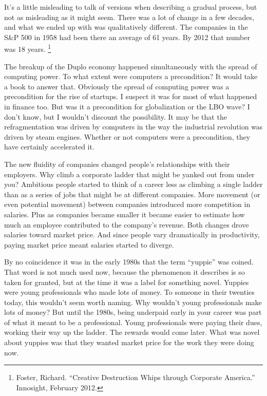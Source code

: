 It's a little misleading to talk of versions when describing a gradual
process, but not as misleading as it might seem. There was a lot of
change in a few decades, and what we ended up with was qualitatively
different. The companies in the S\&P 500 in 1958 had been there an
average of 61 years. By 2012 that number was 18 years.
\footnote{Foster, Richard. ``Creative Destruction Whips through Corporate
America.'' Innosight, February 2012.}

The breakup of the Duplo economy happened simultaneously with the spread
of computing power. To what extent were computers a precondition? It
would take a book to answer that. Obviously the spread of computing
power was a precondition for the rise of startups. I suspect it was for
most of what happened in finance too. But was it a precondition for
globalization or the LBO wave? I don't know, but I wouldn't discount the
possibility. It may be that the refragmentation was driven by computers
in the way the industrial revolution was driven by steam engines.
Whether or not computers were a precondition, they have certainly
accelerated it.

The new fluidity of companies changed people's relationships with their
employers. Why climb a corporate ladder that might be yanked out from
under you? Ambitious people started to think of a career less as
climbing a single ladder than as a series of jobs that might be at
different companies. More movement (or even potential movement) between
companies introduced more competition in salaries. Plus as companies
became smaller it became easier to estimate how much an employee
contributed to the company's revenue. Both changes drove salaries toward
market price. And since people vary dramatically in productivity, paying
market price meant salaries started to diverge.

By no coincidence it was in the early 1980s that the term ``yuppie'' was
coined. That word is not much used now, because the phenomenon it
describes is so taken for granted, but at the time it was a label for
something novel. Yuppies were young professionals who made lots of
money. To someone in their twenties today, this wouldn't seem worth
naming. Why wouldn't young professionals make lots of money? But until
the 1980s, being underpaid early in your career was part of what it
meant to be a professional. Young professionals were paying their dues,
working their way up the ladder. The rewards would come later. What was
novel about yuppies was that they wanted market price for the work they
were doing now.

